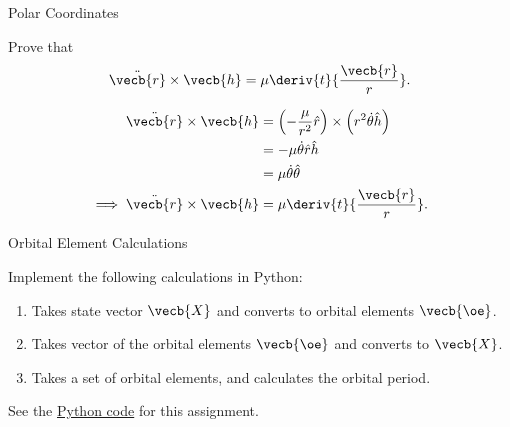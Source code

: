 \begin{hwkProblem}{2}{Polar Coordinates} \label{hwk:p02}

	Prove that \[ \ddot{\vecb{r}} \times \vecb{h} = \mu \deriv{t}{\frac{\vecb{r}}{r}} .\]

	\hwkSol{} \label{hwk:s02}

	\begin{align*}
		\ddot{\vecb{r}} \times \vecb{h}          & = \left(- \frac{\mu}{r^{2}} \hat{r}\right) \times \left(r^{2} \dot{\theta} \hat{h}\right) \\
		\,                                       & = - \mu \dot{\theta} \hat{r} \hat{h}                                                      \\
		\,                                       & = \mu \dot{\theta} \hat{\theta}                                                           \\
		\implies \ddot{\vecb{r}} \times \vecb{h} & = \mu \deriv{t}{\frac{\vecb{r}}{r}}
		.\end{align*}

\end{hwkProblem}

\begin{hwkProblem}{3}{Orbital Element Calculations} \label{hwk:p03}

	Implement the following calculations in Python:
	\begin{enumerate}
		\item \label{hwk:p03a} Takes state vector \(\vecb{X}\) and converts to orbital elements \(\vecb{\oe}\).
		\item \label{hwk:p03b} Takes vector of the orbital elements \(\vecb{\oe}\) and converts to \(\vecb{X}\).
		\item \label{hwk:p03c} Takes a set of orbital elements, and calculates the orbital period.
	\end{enumerate}

	\hwkCode{} \label{code:s03}

	See the \href{https://www.github.com/vaisriv/enae441-hw01/blob/main/code/hw01.py}{Python code} for this assignment.

\end{hwkProblem}

